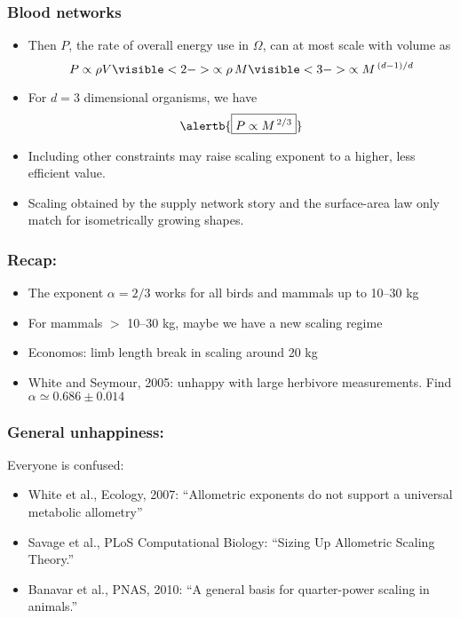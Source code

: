 \begin{frame}
  \frametitle{Blood networks}

  \begin{itemize}
  \item<1-> Then $P$, the rate of overall energy 
    use in $\Omega$, can at most scale with volume as
    $$
    P \propto \rho V 
    \visible<2->{
      \propto \rho \, M
    }
    \visible<3->{
      \propto M^{\, (d-1)/d}
    }
    $$
  \item<4-> 
    For $d=3$ dimensional organisms, we have 
    $$\alertb{\boxed{ P \propto M^{\, 2/3}}}$$
  \item<5-> 
    Including other constraints may raise scaling exponent
    to a higher, less efficient value.
  \item<6->
    Scaling obtained by the supply network story and the surface-area law
    \alert{only match} for isometrically growing shapes.\\
  \end{itemize}    

\end{frame}

\begin{frame}
  \frametitle{Recap:}

  \begin{block}{}
  \begin{itemize}
  \item<+-> 
    The exponent $\alpha = 2/3$ works for all birds and
    mammals up to 10--30 kg
  \item<+-> 
    For mammals $>$ 10--30 kg, maybe we have a new scaling regime
  \item<+-> 
    Economos: limb length break in scaling around 20 kg
  \item<+-> 
    White and Seymour, 2005: unhappy with large herbivore measurements.
    Find $\alpha \simeq 0.686 \pm 0.014$
  \end{itemize}
  \end{block}

\end{frame}

\begin{frame}
  \frametitle{General unhappiness:}

  \begin{block}{Everyone is confused:}
    \begin{itemize}
    \item
      White et al., Ecology, 2007:
      ``Allometric exponents do not support a universal metabolic allometry''\cite{white2007a}
    \item
      Savage et al., PLoS Computational Biology:
      ``Sizing Up Allometric Scaling Theory.''\cite{savage2008a}
    \item 
      Banavar et al., PNAS, 2010:
      ``A general basis for quarter-power scaling in animals.''\cite{banavar2010a}
  \end{itemize}
  \end{block}

\end{frame}


